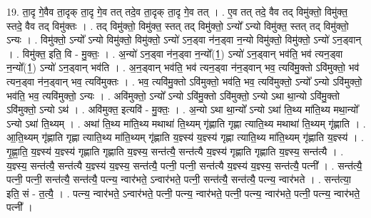 \documentclass[17pt]{extarticle}
\begin{document}
19. ता॒दृ गे॒वैव ता॒दृक् ता॒दृ गे॒व तत् तदे॒व ता॒दृक् ता॒दृ गे॒व तत् । . ए॒व तत् तदे॒ वैव तद् विमु॑क्तो॒ विमु॑क्त॒ स्तदे॒ वैव तद् विमु॑क्तः । . तद् विमु॑क्तो॒ विमु॑क्त॒ स्तत् तद् विमु॑क्तो॒ ऽन्यो᳚ ऽन्यो विमु॑क्त॒ स्तत् तद् विमु॑क्तो॒ ऽन्यः । . विमु॑क्तो॒ ऽन्यो᳚ ऽन्यो विमु॑क्तो॒ विमु॑क्तो॒ ऽन्यो॑ ऽन॒ड्वा न॑न॒ड्वा न॒न्यो विमु॑क्तो॒ विमु॑क्तो॒ ऽन्यो॑ ऽन॒ड्वान् । . विमु॑क्त॒ इति॒ वि - मु॒क्तः॒ । . अ॒न्यो॑ ऽन॒ड्वा न॑न॒ड्वा न॒न्यो᳚(1॒) ऽन्यो॑ ऽन॒ड्वान् भव॑ति॒ भव॑ त्यन॒ड्वा न॒न्यो᳚(1॒) ऽन्यो॑ ऽन॒ड्वान् भव॑ति । . अ॒न॒ड्वान् भव॑ति॒ भव॑ त्यन॒ड्वा न॑न॒ड्वान् भव॒ त्यवि॑मु॒क्तो ऽवि॑मुक्तो॒ भव॑ त्यन॒ड्वा न॑न॒ड्वान् भव॒ त्यवि॑मुक्तः । . भव॒ त्यवि॑मु॒क्तो ऽवि॑मुक्तो॒ भव॑ति॒ भव॒ त्यवि॑मुक्तो॒ ऽन्यो᳚ ऽन्यो ऽवि॑मुक्तो॒ भव॑ति॒ भव॒ त्यवि॑मुक्तो॒ ऽन्यः । . अवि॑मुक्तो॒ ऽन्यो᳚ ऽन्यो ऽवि॑मु॒क्तो ऽवि॑मुक्तो॒ ऽन्यो ऽथा था॒न्यो ऽवि॑मु॒क्तो ऽवि॑मुक्तो॒ ऽन्यो ऽथ॑ । . अवि॑मुक्त॒ इत्यवि॑ - मु॒क्तः॒ । . अ॒न्यो ऽथा था॒न्यो᳚ ऽन्यो ऽथा॑ ति॒थ्य मा॑ति॒थ्य मथा॒न्यो᳚ ऽन्यो ऽथा॑ ति॒थ्यम् । . अथा॑ ति॒थ्य मा॑ति॒थ्य मथाथा॑ ति॒थ्यम् गृ॑ह्णाति गृह्णा त्याति॒थ्य मथाथा॑ ति॒थ्यम् गृ॑ह्णाति । . आ॒ति॒थ्यम् गृ॑ह्णाति गृह्णा त्याति॒थ्य मा॑ति॒थ्यम् गृ॑ह्णाति य॒ज्ञ्स्य॑ य॒ज्ञ्स्य॑ गृह्णा त्याति॒थ्य मा॑ति॒थ्यम् गृ॑ह्णाति य॒ज्ञ्स्य॑ । . गृ॒ह्णा॒ति॒ य॒ज्ञ्स्य॑ य॒ज्ञ्स्य॑ गृह्णाति गृह्णाति य॒ज्ञ्स्य॒ सन्त॑त्यै॒ सन्त॑त्यै य॒ज्ञ्स्य॑ गृह्णाति गृह्णाति य॒ज्ञ्स्य॒ सन्त॑त्यै । . य॒ज्ञ्स्य॒ सन्त॑त्यै॒ सन्त॑त्यै य॒ज्ञ्स्य॑ य॒ज्ञ्स्य॒ सन्त॑त्यै॒ पत्नी॒ पत्नी॒ सन्त॑त्यै य॒ज्ञ्स्य॑ य॒ज्ञ्स्य॒ सन्त॑त्यै॒ पत्नी᳚ । . सन्त॑त्यै॒ पत्नी॒ पत्नी॒ सन्त॑त्यै॒ सन्त॑त्यै॒ पत्न्य॒ न्वार॑भते॒ ऽन्वार॑भते॒ पत्नी॒ सन्त॑त्यै॒ सन्त॑त्यै॒ पत्न्य॒ न्वार॑भते । . सन्त॑त्या॒ इति॒ सं - त॒त्यै॒ । . पत्न्य॒ न्वार॑भते॒ ऽन्वार॑भते॒ पत्नी॒ पत्न्य॒ न्वार॑भते॒ पत्नी॒ पत्न्य॒ न्वार॑भते॒ पत्नी॒ पत्न्य॒ न्वार॑भते॒ पत्नी᳚ । \newline
\end{document}
